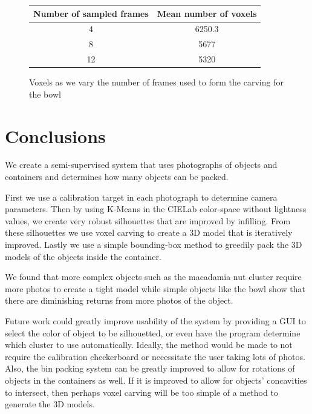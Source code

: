 \documentclass[10pt,twocolumn,letterpaper]{article}
\begin{document}
\begin{figure}[H]
    \centering
    \begin{tabular}[\textwidth]{|c|c|}
    \hline
    Number of sampled frames & Mean number of voxels \\
    \hline
    4 & 6250.3 \\
    8 & 5677 \\
    12 & 5320 \\
    \hline
    \end{tabular}
    \caption{Voxels as we vary the number of frames used to form the carving for the bowl}
    \label{bowl-voxels}
\end{figure}

\pagebreak
\section{Conclusions}

We create a semi-supervised system that uses photographs of objects and containers and determines how many objects can be packed.

First we use a calibration target in each photograph to determine camera parameters. Then by using K-Means in the CIELab color-space without lightness values, we create very robust silhouettes that are improved by infilling. From these silhouettes we use voxel carving to create a 3D model that is iteratively improved. Lastly we use a simple bounding-box method to greedily pack the 3D models of the objects inside the container.

We found that more complex objects such as the macadamia nut cluster require more photos to create a tight model while simple objects like the bowl show that there are diminishing returns from more photos of the object.

Future work could greatly improve usability of the system by providing a GUI to select the color of object to be silhouetted, or even have the program determine which cluster to use automatically. Ideally, the method would be made to not require the calibration checkerboard or necessitate the user taking lots of photos. Also, the bin packing system can be greatly improved to allow for rotations of objects in the containers as well. If it is improved to allow for objects' concavities to intersect, then perhaps voxel carving will be too simple of a method to generate the 3D models.


{\small


}
\end{document}
